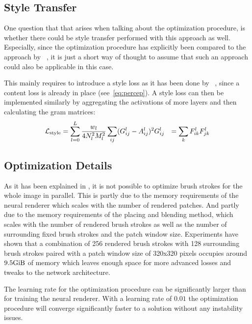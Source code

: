 \subsection{Style Transfer}

One question that that arises when talking about the optimization procedure, is whether
there could be style transfer performed with this approach as well.
Especially, since the optimization procedure has explicitly been compared to the
approach by \citeauthor*{Gatys}~\cite{Gatys}, it is just a short way of thought to
assume that such an approach could also be applicable in this case.

This mainly requires to introduce a style loss as it has been done by \citeauthor*{Gatys}~\cite{Gatys},
since a content loss is already in place (see~\eqref{eq:percep}).
A style loss can then be implemented similarly by aggregating the activations of
more layers and then calculating the gram matrices:
\begin{align}
    \mathcal{L}_{\text{style}} & = \sum_{l=0}^L \frac{w_l}{4 N^2_l M^2_l} \sum_{ij} (G_{ij}^l - A_{ij}^l)^2
    G_{ij}^l & = \sum_k F_{ik}^l F_{jk}^l
\end{align}

\subsection{Optimization Details}

As it has been explained in , it is not possible to optimize
brush strokes for the whole image in parallel.
This is partly due to the memory requirements of the neural renderer which scales
with the number of rendered patches.
And partly due to the memory requirements of the placing and blending method, which
scales with the number of rendered brush strokes as well as the number of surrounding
fixed brush strokes and the patch window size.
Experiments have shown that a combination of 256 rendered brush strokes with 128
surrounding brush strokes paired with a patch window size of 320x320 pixels occupies
around $9.5 \si{\gibi \byte}$ of memory which leaves enough space for more advanced
losses and tweaks to the network architecture.

The learning rate for the optimization procedure can be significantly larger than for
training the neural renderer.
With a learning rate of $0.01$ the optimization procedure will converge significantly
faster to a solution without any instability issues.


